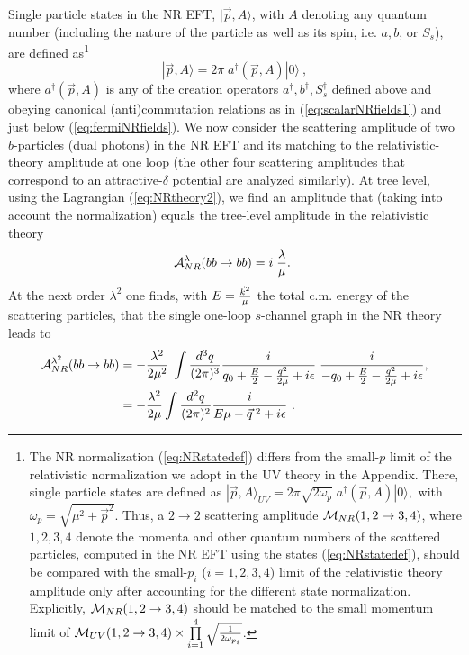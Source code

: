 \documentclass[11pt]{article}
\begin{document}
Single particle states   in the NR EFT, $| \vec{p}, A\rangle$, with $A$ denoting any quantum number (including the nature of the particle as well as its spin, i.e. $a, b$, or $S_s$), are defined as\footnote{\label{norm}The NR normalization (\ref{eq:NRstatedef}) differs from the small-$p$ limit of the   relativistic normalization we  adopt in the UV theory in the Appendix. There, single particle states are defined as $
  | \vec{p}, A \rangle_{UV} =  2 \pi    \sqrt{2 \omega_p} \; a^\dagger(\vec{p}, A)  | 0 \rangle,
$
with $\omega_p = \sqrt{\mu^2 + \vec{p}^2}$.
  Thus, a $2\rightarrow 2$ scattering amplitude ${\cal{M}}_{NR}(1,2\rightarrow 3,4)$, where $1,2,3,4$ denote the momenta and other quantum numbers of the scattered particles,  computed in the NR EFT using the states (\ref{eq:NRstatedef}), should be compared with the small-$p_i$ ($i=1,2,3,4$) limit of the    relativistic theory amplitude  only after accounting for the different state normalization. Explicitly, ${\cal{M}}_{NR}(1,2\rightarrow 3,4)$ should be matched to the small momentum limit of $ {\cal{M}}_{UV}(1,2\rightarrow 3,4)\times \prod\limits_{i=1}^4 \sqrt{ 1 \over 2 \omega_{p_i}}$.}   \begin{equation}
  \label{eq:NRstatedef}
  | \vec{p}, A \rangle =  2 \pi     \; a^\dagger(\vec{p}, A)  | 0 \rangle~,
  \end{equation} 
  where $a^\dagger(\vec{p}, A)$ is any of the creation operators $a^\dagger, b^\dagger, S_{s}^\dagger$ defined above and obeying canonical (anti)commutation relations as in (\ref{eq:scalarNRfields1}) and just below (\ref{eq:fermiNRfields}).
  We now consider  the  scattering amplitude of two $b$-particles (dual photons) in the NR EFT and its matching to the relativistic-theory amplitude at one loop (the  other four scattering amplitudes that correspond to an attractive-$\delta$ potential are analyzed similarly).  
 At tree level, using the Lagrangian (\ref{eq:NRtheory2}), we find an amplitude that (taking into account the normalization) equals the tree-level amplitude in the relativistic theory \begin{equation}
\label{btreeNR}
{\cal{A}}_{NR}^{\lambda}(bb \rightarrow bb) = i \; {\lambda \over \mu}. ~
\end{equation} At the next order $\lambda^2$  one finds, with  $E = {\vec{k}^2 \over  \mu}$ the total c.m. energy of the
scattering particles, that the single one-loop $s$-channel graph in the NR theory leads to
\begin{align}
\label{boneloopNR}
{\cal{A}}_{NR}^{\lambda^2}(bb \rightarrow bb) &=  -{\lambda^2 \over 2 \mu^2} \;  \int {d^3 q \over (2 \pi)^3} {i \over q_0 + {E\over 2} - {\vec{q}^2 \over 2 \mu} + i \epsilon} \; {i \over - q_0 + {E \over 2} - {\vec{q}^2 \over 2 \mu}+ i \epsilon}, \nonumber \\
&= 
 -  {\lambda^2 \over  2 \mu }   \int  {d^2 q \over (2 \pi)^2} {i \over   E\mu - \vec{q}^{\; 2} + i \epsilon}~. \end{align}
\end{document}
